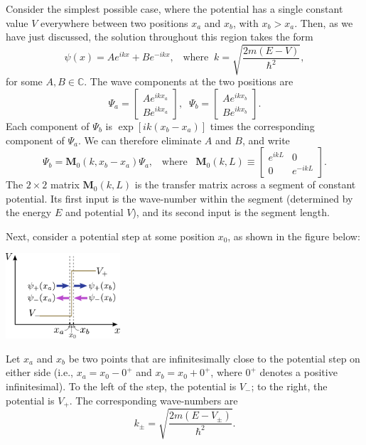 \documentclass[pra,12pt]{revtex4}
\begin{document}
Consider the simplest possible case, where the potential has a single
constant value $V$ everywhere between two positions $x_a$ and $x_b$,
with $x_b > x_a$.  Then, as we have just discussed, the solution
throughout this region takes the form
\begin{equation}
  \psi(x) = A e^{ik x} + B e^{-ik x}, \;\;\; \mathrm{where}\;\; k = \sqrt{\frac{2m(E-V)}{\hbar^2}},
\end{equation}
for some $A, B\in\mathbb{C}$.  The wave components at the two
positions are
\begin{equation}
  \Psi_a = \begin{bmatrix} A e^{ik x_a} \\ B e^{ikx_a} \end{bmatrix}, \;\; \Psi_b = \begin{bmatrix} A e^{ik x_b} \\ B e^{ikx_b} \end{bmatrix}.
\end{equation}
Each component of $\Psi_b$ is $\exp[ik(x_b-x_a)]$ times the
corresponding component of $\Psi_a$.  We can therefore eliminate $A$
and $B$, and write
\begin{equation}
  \Psi_b = \mathbf{M}_0(k, x_b-x_a) \Psi_a, \;\;\;\mathrm{where}\;\;\; \mathbf{M}_0(k,L) \equiv \begin{bmatrix}e^{ikL} & 0 \\ 0 & e^{-ikL}\end{bmatrix}.
\end{equation}
The $2\times2$ matrix $\mathbf{M}_0(k,L)$ is the transfer matrix
across a segment of constant potential.  Its first input is the
wave-number within the segment (determined by the energy $E$ and
potential $V$), and its second input is the segment length.

Next, consider a potential step at some position $x_0$, as shown in
the figure below:

\begin{center}
  \includegraphics[width=0.32\textwidth]{transfer_step}
\end{center}

\noindent
Let $x_a$ and $x_b$ be two points that are infinitesimally close to
the potential step on either side (i.e., $x_a = x_0 - 0^+$ and $x_b =
x_0 + 0^+$, where $0^+$ denotes a positive infinitesimal).  To the
left of the step, the potential is $V_-$; to the right, the potential
is $V_+$.  The corresponding wave-numbers are
\begin{equation}
  k_\pm = \sqrt{\frac{2m(E-V_\pm)}{\hbar^2}}.
\end{equation}
\end{document}
